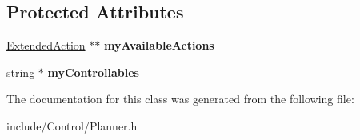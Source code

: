 \subsection*{Protected Attributes}
\begin{DoxyCompactItemize}
\item 
\hypertarget{classCartWheel_1_1Planner_ac9e698cb67d4838fb80e5919daac9529}{
\hyperlink{classCartWheel_1_1ExtendedAction}{ExtendedAction} $\ast$$\ast$ {\bfseries myAvailableActions}}
\label{classCartWheel_1_1Planner_ac9e698cb67d4838fb80e5919daac9529}

\item 
\hypertarget{classCartWheel_1_1Planner_a7f7efc69bbf1c08a6c6870707d73ea95}{
string $\ast$ {\bfseries myControllables}}
\label{classCartWheel_1_1Planner_a7f7efc69bbf1c08a6c6870707d73ea95}

\end{DoxyCompactItemize}


The documentation for this class was generated from the following file:\begin{DoxyCompactItemize}
\item 
include/Control/Planner.h\end{DoxyCompactItemize}
